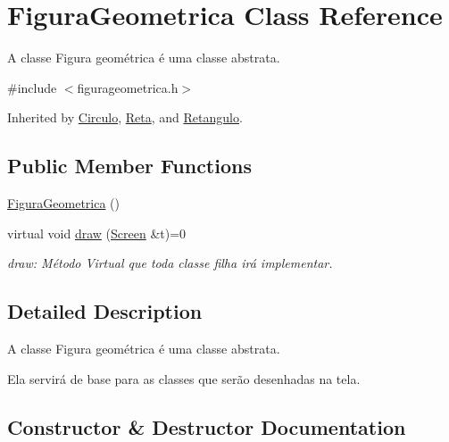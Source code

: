 \hypertarget{class_figura_geometrica}{}\section{Figura\+Geometrica Class Reference}
\label{class_figura_geometrica}


A classe Figura geométrica é uma classe abstrata.  




{\ttfamily \#include $<$figurageometrica.\+h$>$}



Inherited by \hyperlink{class_circulo}{Circulo}, \hyperlink{class_reta}{Reta}, and \hyperlink{class_retangulo}{Retangulo}.

\subsection*{Public Member Functions}
\begin{DoxyCompactItemize}
\item 
\hyperlink{class_figura_geometrica_a81d7c7efaea511e60a15f5a363138dd9}{Figura\+Geometrica} ()
\item 
virtual void \hyperlink{class_figura_geometrica_a8ee8dedc060b6059a805ea091aef2c41}{draw} (\hyperlink{class_screen}{Screen} \&t)=0
\begin{DoxyCompactList}\small\item\em draw\+: Método Virtual que toda classe filha irá implementar. \end{DoxyCompactList}\end{DoxyCompactItemize}


\subsection{Detailed Description}
A classe Figura geométrica é uma classe abstrata. 

Ela servirá de base para as classes que serão desenhadas na tela. 

\subsection{Constructor \& Destructor Documentation}
\mbox{\label{class_figura_geometrica_a81d7c7efaea511e60a15f5a363138dd9}} 
